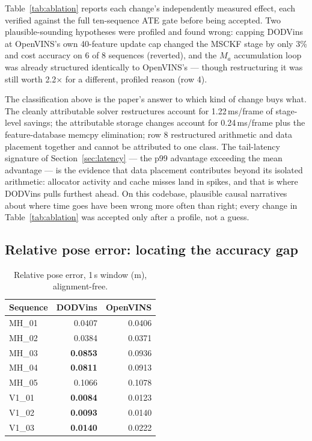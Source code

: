\documentclass[10pt,conference,letterpaper]{IEEEtran}
\begin{document}
Table~\ref{tab:ablation} reports each change's independently measured effect,
each verified against the full ten-sequence ATE gate before being accepted.
Two plausible-sounding hypotheses were profiled and found wrong: capping
DODVins at OpenVINS's own 40-feature update cap changed the MSCKF stage by
only 3\% and cost accuracy on 6 of 8 sequences (reverted), and the $M_a$
accumulation loop was already structured identically to OpenVINS's ---
though restructuring it was still worth 2.2$\times$ for a different,
profiled reason (row 4).

The classification above is the paper's answer to which kind of change
buys what. The cleanly attributable solver restructures account for
1.22\,ms/frame of stage-level savings; the attributable storage changes
account for 0.24\,ms/frame plus the feature-database memcpy elimination;
row 8 restructured arithmetic and data placement together and cannot be
attributed to one class. The tail-latency signature of
Section~\ref{sec:latency} --- the p99 advantage exceeding the mean
advantage --- is the evidence that data placement contributes beyond its
isolated arithmetic: allocator activity and cache misses land in spikes,
and that is where DODVins pulls furthest ahead. On this codebase,
plausible causal narratives about where time goes have been wrong more
often than right; every change in Table~\ref{tab:ablation} was accepted
only after a profile, not a guess.

\subsection{Relative pose error: locating the accuracy gap}
\label{sec:rpe}

\begin{table}[t]
\caption{Relative pose error, 1\,s window (m), alignment-free.}
\label{tab:rpe}
\centering
\begin{tabular}{lrr}
\toprule
Sequence & DODVins & OpenVINS \\
\midrule
MH\_01 & 0.0407 & 0.0406 \\
MH\_02 & 0.0384 & 0.0371 \\
MH\_03 & \textbf{0.0853} & 0.0936 \\
MH\_04 & \textbf{0.0811} & 0.0913 \\
MH\_05 & 0.1066 & 0.1078 \\
V1\_01 & \textbf{0.0084} & 0.0123 \\
V1\_02 & \textbf{0.0093} & 0.0140 \\
V1\_03 & \textbf{0.0140} & 0.0222 \\
\bottomrule
\end{tabular}
\end{table}
\end{document}
